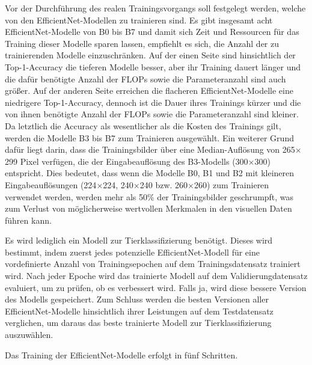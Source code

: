 Vor der Durchführung des realen Trainingsvorgangs soll festgelegt werden, welche von den EfficientNet-Modellen zu trainieren sind. Es gibt insgesamt acht EfficientNet-Modelle von B0 bis B7 und damit sich Zeit und Ressourcen für das Training dieser Modelle sparen lassen, empfiehlt es sich, die Anzahl der zu trainierenden Modelle einzuschränken. Auf der einen Seite sind hinsichtlich der Top-1-Accuracy die tieferen Modelle besser, aber ihr Training dauert länger und die dafür benötigte Anzahl der FLOPs sowie die Parameteranzahl sind auch größer. Auf der anderen Seite erreichen die flacheren EfficientNet-Modelle eine niedrigere Top-1-Accuracy, dennoch ist die Dauer ihres Trainings kürzer und die von ihnen benötigte Anzahl der FLOPs sowie die Parameteranzahl sind kleiner. Da letztlich die Accuracy als wesentlicher als die Kosten des Trainings gilt, werden die Modelle B3 bis B7 zum Trainieren ausgewählt. Ein weiterer Grund dafür liegt darin, dass die Trainingsbilder über eine Median-Auflösung von 265$\times$299 Pixel verfügen, die der Eingabeauflösung des B3-Modells (300$\times$300) entspricht. Dies bedeutet, dass wenn die Modelle B0, B1 und B2 mit kleineren Eingabeauflösungen (224$\times$224, 240$\times$240 bzw. 260$\times$260) zum Trainieren verwendet werden, werden mehr als 50\% der Trainingsbilder geschrumpft, was zum Verlust von möglicherweise wertvollen Merkmalen in den visuellen Daten führen kann.

Es wird lediglich ein Modell zur Tierklassifizierung benötigt. Dieses wird bestimmt, indem zuerst jedes potenzielle EfficientNet-Modell für eine vordefinierte Anzahl von Trainingsepochen auf dem Trainingsdatensatz trainiert wird. Nach jeder Epoche wird das trainierte Modell auf dem Validierungdatensatz evaluiert, um zu prüfen, ob es verbessert wird. Falls ja, wird diese bessere Version des Modells gespeichert. Zum Schluss werden die besten Versionen aller EfficientNet-Modelle hinsichtlich ihrer Leistungen auf dem Testdatensatz verglichen, um daraus das beste trainierte Modell zur Tierklassifizierung auszuwählen.

Das Training der EfficientNet-Modelle erfolgt in fünf Schritten.

